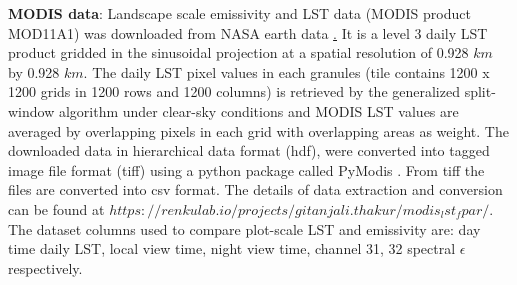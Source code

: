\documentclass[fleqn,10pt]{wlscirep}
\begin{document}
{\textbf{MODIS data}:
Landscape scale emissivity and LST data (MODIS product MOD11A1) was downloaded from NASA earth data \href{https://lpdaac.usgs.gov/}. It is a level 3 daily LST product gridded in the sinusoidal projection at a spatial resolution of 0.928 $km$ by 0.928 $km$. The daily LST pixel values in each granules (tile contains 1200 x 1200 grids in 1200 rows and 1200 columns) is retrieved by the generalized split-window algorithm under clear-sky conditions and MODIS LST values are averaged by overlapping pixels in each grid with overlapping areas as weight\cite{wan2007collection}. The downloaded data in hierarchical data format (hdf), were converted into tagged image file format (tiff) using a python package called PyModis \cite{delucchi2014pymodis}. From tiff the files are converted into csv format. The details of data extraction and conversion can be found at $https://renkulab.io/projects/gitanjali.thakur/modis_lst_fpar/$. The dataset columns used to compare plot-scale LST and emissivity are: day time daily LST, local view time, night view time, channel 31, 32  spectral $\epsilon$ respectively. 
 
}
\end{document}
